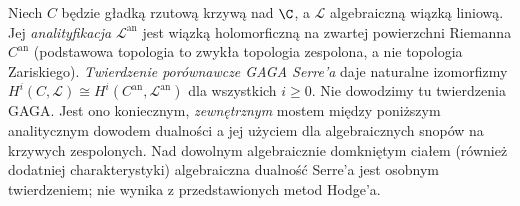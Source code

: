 \begin{uwaga}
Niech $C$ będzie gładką rzutową krzywą nad $\C$, a
$\mathcal L$ algebraiczną wiązką liniową. Jej
\emph{analityfikacja} $\mathcal L^{\mathrm{an}}$ jest
wiązką holomorficzną na zwartej powierzchni Riemanna
$C^{\mathrm{an}}$ (podstawowa topologia to zwykła
topologia zespolona, a nie topologia Zariskiego).
\emph{Twierdzenie porównawcze GAGA Serre'a} daje
naturalne izomorfizmy
$H^i(C,\mathcal L)\cong
H^i(C^{\mathrm{an}},\mathcal L^{\mathrm{an}})$
dla wszystkich $i\ge0$. Nie dowodzimy tu twierdzenia
GAGA. Jest ono koniecznym, \emph{zewnętrznym}
mostem między poniższym analitycznym dowodem dualności
a jej użyciem dla algebraicznych snopów na krzywych
zespolonych. Nad dowolnym algebraicznie domkniętym
ciałem (również dodatniej charakterystyki)
algebraiczna dualność Serre'a jest osobnym twierdzeniem;
nie wynika z przedstawionych metod Hodge'a.
\end{uwaga}

